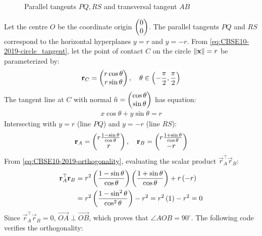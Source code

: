 \begin{enumerate}[label=\thesubsection.\arabic*, ref=\thesubsection.\theenumi]
\begin{figure}[H]
		\caption{Parallel tangents $PQ, RS$ and transversal tangent $AB$}
		\label{fig:EE26BTECH11223-10-24}
	\end{figure}
	
	\solution
	Let the centre $O$ be the coordinate origin $\begin{pmatrix}0 \\ 0\end{pmatrix}$.
	The parallel tangents $PQ$ and $RS$ correspond to the horizontal hyperplanes $y = r$ and $y = -r$.
	From \eqref{eq:CBSE10-2019-circle_tangent}, let the point of contact $C$ on the circle $\left\lVert\mathbf{x}\right\rVert = r$ be parameterized by:
	\begin{align}
		\mathbf{r}_C = \begin{pmatrix}r\cos\theta \\ r\sin\theta\end{pmatrix}, \quad \theta \in \left(-\frac{\pi}{2}, \frac{\pi}{2}\right)
	\end{align}
	The tangent line at $C$ with normal $\hat{n} = \begin{pmatrix}\cos\theta \\ \sin\theta\end{pmatrix}$ has equation:
	\begin{align}
		x\cos\theta + y\sin\theta = r
	\end{align}
	Intersecting with $y = r$ (line $PQ$) and $y = -r$ (line $RS$):
	\begin{align}
		\mathbf{r}_A = \begin{pmatrix}r\frac{1 - \sin\theta}{\cos\theta} \\ r\end{pmatrix}, \quad \mathbf{r}_B = \begin{pmatrix}r\frac{1 + \sin\theta}{\cos\theta} \\ -r\end{pmatrix}
	\end{align}
	From \eqref{eq:CBSE10-2019-orthogonality}, evaluating the scalar product $\vec{r}_A^\top \vec{r}_B$:
	\begin{align}
		\mathbf{r}_A^\top \mathbf{r}_B &= r^2 \left(\frac{1 - \sin\theta}{\cos\theta}\right)\left(\frac{1 + \sin\theta}{\cos\theta}\right) + r\left(-r\right) \\
		&= r^2 \left(\frac{1 - \sin^2\theta}{\cos^2\theta}\right) - r^2 = r^2\left(1\right) - r^2 = 0
	\end{align}
	Since $\vec{r}_A^\top \vec{r}_B = 0$, $\vec{OA} \perp \vec{OB}$, which proves that $\angle AOB = 90^\circ$.
	The following code verifies the orthogonality:


\end{enumerate}

